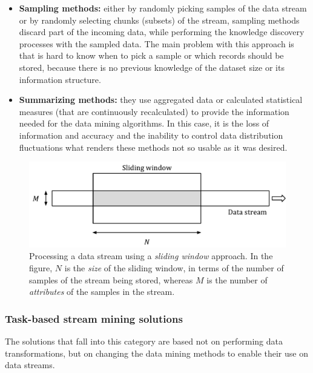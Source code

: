 \begin{itemize}
	\item \textbf{Sampling methods:} either by randomly picking samples of the data stream or by randomly selecting chunks (subsets) of the stream, sampling methods discard part of the incoming data, while performing the knowledge discovery processes with the sampled data. The main problem with this approach is that is hard to know when to pick a sample or which records should be stored, because there is no previous knowledge of the dataset size or its information structure.

	\item \textbf{Summarizing methods:} they use aggregated data or calculated statistical measures (that are continuously recalculated) to provide the information needed for the data mining algorithms. In this case, it is the loss of information and accuracy and the inability to control data distribution fluctuations what renders these methods not so usable as it was desired.
\end{itemize}

\begin{figure}
\centering
\includegraphics[width=0.9\linewidth]{figures/sliding-window.pdf}
\caption[Sliding window based stream processing.]{Processing a data stream using a \textit{sliding window} approach. In the figure, $N$ is the \textit{size} of the sliding window, in terms of the number of samples of the stream being stored, whereas $M$ is the number of \textit{attributes} of the samples in the stream.}
\label{fig:sliding-window}
\end{figure}

\subsubsection*{Task-based stream mining solutions}

The solutions that fall into this category are based not on performing data transformations, but on changing the data mining methods to enable their use on data streams.

